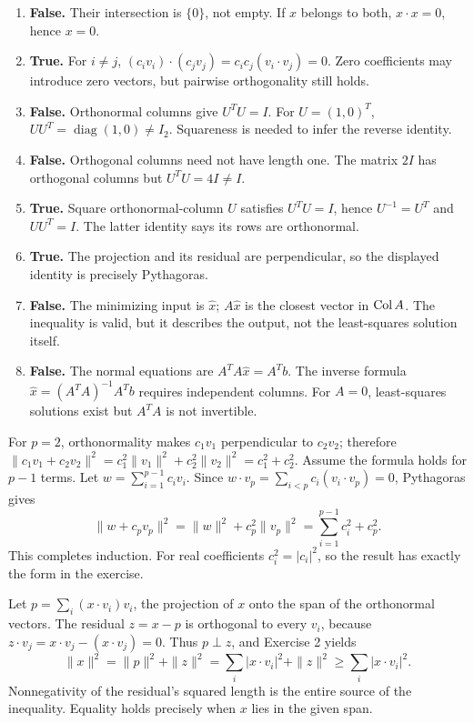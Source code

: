\begin{enumerate}[label=(\alph*)]
when the set is all of $\R^n$.
\item \textbf{False.} Their intersection is $\{0\}$, not empty.
If $x$ belongs to both, $x\cdot x=0$, hence $x=0$.
\item \textbf{True.} For $i\ne j$,
$(c_iv_i)\cdot(c_jv_j)=c_ic_j(v_i\cdot v_j)=0$.
Zero coefficients may introduce zero vectors, but pairwise orthogonality still holds.
\item \textbf{False.} Orthonormal columns give $U^TU=I$.
For $U=(1,0)^T$, $UU^T=\operatorname{diag}(1,0)\ne I_2$.
Squareness is needed to infer the reverse identity.
\item \textbf{False.} Orthogonal columns need not have length one.
The matrix $2I$ has orthogonal columns but $U^TU=4I\ne I$.
\item \textbf{True.} Square orthonormal-column $U$ satisfies
$U^TU=I$, hence $U^{-1}=U^T$ and $UU^T=I$. The latter identity
says its rows are orthonormal.
\item \textbf{True.} The projection and its residual are perpendicular,
so the displayed identity is precisely Pythagoras.
\item \textbf{False.} The minimizing input is $\widehat x$;
$A\widehat x$ is the closest vector in $\operatorname{Col} A$. The inequality is valid,
but it describes the output, not the least-squares solution itself.
\item \textbf{False.} The normal equations are
$A^TA\widehat x=A^Tb$. The inverse formula
$\widehat x=(A^TA)^{-1}A^Tb$ requires independent columns.
For $A=0$, least-squares solutions exist but $A^TA$ is not invertible.
\end{enumerate}

For $p=2$, orthonormality makes $c_1v_1$ perpendicular to $c_2v_2$;
therefore
$\|c_1v_1+c_2v_2\|^2=c_1^2\|v_1\|^2+c_2^2\|v_2\|^2=c_1^2+c_2^2$.
Assume the formula holds for $p-1$ terms. Let
$w=\sum_{i=1}^{p-1}c_iv_i$. Since
$w\cdot v_p=\sum_{i<p}c_i(v_i\cdot v_p)=0$, Pythagoras gives
\[
 \|w+c_pv_p\|^2=\|w\|^2+c_p^2\|v_p\|^2
 =\sum_{i=1}^{p-1}c_i^2+c_p^2.
\]
This completes induction. For real coefficients $c_i^2=|c_i|^2$,
so the result has exactly the form in the exercise.

Let $p=\sum_i(x\cdot v_i)v_i$, the projection of $x$ onto the span
of the orthonormal vectors. The residual $z=x-p$ is orthogonal to every
$v_i$, because $z\cdot v_j=x\cdot v_j-(x\cdot v_j)=0$.
Thus $p\perp z$, and Exercise 2 yields
\[
 \|x\|^2=\|p\|^2+\|z\|^2
 =\sum_i|x\cdot v_i|^2+\|z\|^2
 \ge\sum_i|x\cdot v_i|^2.
\]
Nonnegativity of the residual's squared length is the entire source of the
inequality. Equality holds precisely when $x$ lies in the given span.

